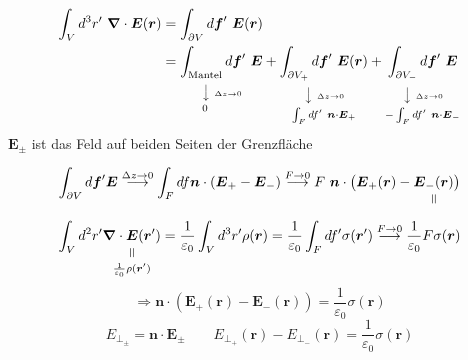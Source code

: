 \documentclass[titlepage,11pt,a4paper,ngerman]{report}
\newcommand{\verteq}{\rotatebox{90}{$\,=$}}
\newcommand{\equalto}[2]{\underset{\scriptstyle\overset{\mkern4mu\verteq}{#2}}{#1}}
\newcommand{\custo}[3]{\underset{\scriptstyle\overset{\mkern4mu\rotatebox{-90}{$\,#1$}}{#3}}{#2}}
\renewcommand{\vec}[1]{\boldsymbol{#1}}
\renewcommand{\epsilon}{\varepsilon}
\newcommand{\vabla}{\boldsymbol{\nabla}}
\begin{document}
\begin{align*}
\int_V d^3 r'\ \vabla \cdot \vec{E}(\vec{r}) &= \int_{\partial V} d\vec{f}'\ \vec{E}(\vec{r})\\
&=\custo{\rotatebox{90}{$\scriptscriptstyle{\Delta z \to 0}$}\atop \longrightarrow}{\int_{\textrm{Mantel}} d\vec{f}'\ \vec{E}}{\hspace{-23.5pt}0} + \custo{\rotatebox{90}{$\scriptscriptstyle{\Delta z \to 0}$}\atop \longrightarrow}{\int_{\partial V_+} d\vec{f}'\ \vec{E}(\vec{r})}{\int_F df'\ \vec{n} \cdot \vec{E}_+} + \custo{\rotatebox{90}{$\scriptscriptstyle{\Delta z \to 0}$}\atop \longrightarrow}{\int_{\partial V_-} d\vec{f}'\ \vec{E}}{- \int_F df'\ \vec{n} \cdot \vec{E}_-}
\end{align*}
$ \vec{E}_{\pm} $ ist das Feld auf beiden Seiten der Grenzfläche

\begin{equation*}
\int_{\partial V} d\vec{f}' \vec{E} \buildrel \Delta z \to 0 \over \longrightarrow \int_{F} df \vec{n} \cdot (\vec{E}_+ - \vec{E}_-) \buildrel F \to 0 \over \longrightarrow F\  \vec{n} \cdot \big(\vec{E}_+(\vec{r}) - \equalto{\vec{E}_-(\vec{r})}{}\big)
\end{equation*}
\begin{equation*}
\int_V d^2r' \equalto{\vec{\nabla} \cdot \vec{E}(\vec{r}')}{\frac{1}{\epsilon_0} \rho(\vec{r}')} = \frac{1}{\epsilon_0} \int_V d^3r' \rho(\vec{r}) = \frac{1}{\epsilon_0} \int_F df'  \sigma(\vec{r}') \buildrel F \to 0 \over \longrightarrow \frac{1}{\epsilon_0} F \sigma(\vec{r})
\end{equation*}
\begin{equation*}
\Rightarrow \vec{n} \cdot \left(\vec{E}_+(\vec{r}) - \vec{E}_-(\vec{r}) \right) = \frac{1}{\epsilon_0} \sigma(\vec{r})
\end{equation*}
\begin{equation*}
E_{\perp_\pm} = \vec{n} \cdot \vec{E}_{\pm} \qquad E_{\perp_+}(\vec{r}) - E_{\perp_-} (\vec{r}) = \frac{1}{\epsilon_0} \sigma(\vec{r})
\end{equation*}
\end{document}
